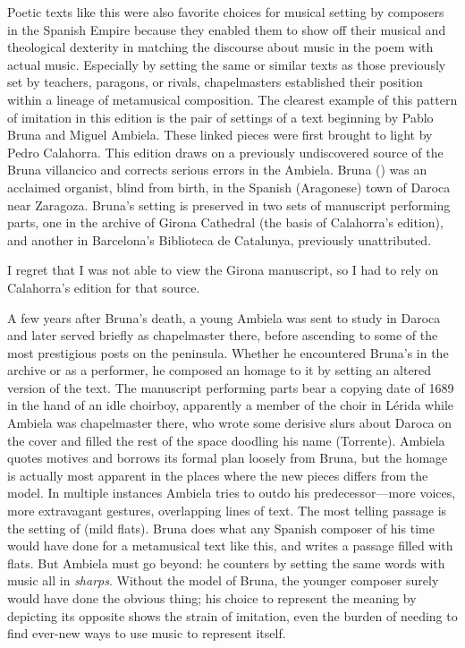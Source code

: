 Poetic texts like this were also favorite choices for musical setting by
composers in the Spanish Empire because they enabled them to show off their
musical and theological dexterity in matching the discourse about music in the
poem with actual music.
Especially by setting the same or similar texts as those previously set
by teachers, paragons, or rivals, chapelmasters established their position
within a lineage of metamusical composition.
The clearest example of this pattern of imitation in this edition is the pair
of settings of a text beginning  by Pablo
Bruna and Miguel Ambiela.
These linked pieces were first brought to light by Pedro Calahorra.%
    \citXXX[Calahorra]
This edition draws on a previously undiscovered source of the Bruna villancico
and corrects serious errors in the Ambiela.
Bruna (\XXX[dates]) was an acclaimed organist, blind from birth, in the
Spanish (Aragonese) town of Daroca near Zaragoza.
Bruna's setting is preserved in two sets of manuscript performing parts, one
in the archive of Girona Cathedral (the basis of Calahorra's edition), and
another in Barcelona's Biblioteca de Catalunya, previously unattributed.%
\begin{Footnote}
    I regret that I was not able to view the Girona manuscript, so I had to
    rely on Calahorra's edition for that source.
\end{Footnote}
A few years after Bruna's death, a young Ambiela was sent to study in Daroca
and later served briefly as chapelmaster there, before ascending to some of
the most prestigious posts on the peninsula.
Whether he encountered Bruna's  in the archive or as a
performer, he composed an homage to it by setting an altered version of the
text.
The manuscript performing parts bear a copying date of 1689 in the hand of an
idle choirboy, apparently a member of the choir in Lérida while Ambiela was
chapelmaster there, who wrote some derisive slurs about Daroca on the cover
and filled the rest of the space doodling his name (Torrente).
Ambiela quotes motives and borrows its formal plan loosely from Bruna, but the
homage is actually most apparent in the places where the new pieces differs
from the model.
In multiple instances Ambiela tries to outdo his predecessor---more voices,
more extravagant gestures, overlapping lines of text.
The most telling passage is the setting of  (mild
flats).
Bruna does what any Spanish composer of his time would have done for a
metamusical text like this, and writes a passage filled with flats.
But Ambiela must go beyond: he counters by setting the same words with music
all in \emph{sharps}. 
Without the model of Bruna, the younger composer surely would have done the
obvious thing; his choice to represent the meaning by depicting its opposite
shows the strain of imitation, even the burden of needing to find ever-new
ways to use music to represent itself.

